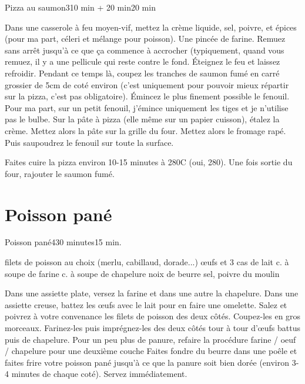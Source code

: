 {\begin{recette}{Pizza au saumon}{3}{10 min + 20 min}{20 min}
\begin{preparation}
\etape Dans une casserole à feu moyen-vif, mettez la crème liquide, sel, poivre, et épices (pour ma part, céleri et mélange 
pour poisson). Une pincée de farine. Remuez sans arrêt jusqu'à ce que ça commence à accrocher (typiquement, quand vous remuez, 
il y a une pellicule qui reste contre le fond. Éteignez le feu et laissez refroidir.
\etape Pendant ce temps là, coupez les tranches de saumon fumé en carré grossier de 5cm de coté environ (c'est uniquement pour pouvoir mieux répartir sur la pizza, c'est pas obligatoire).
\etape Émincez le plus finement possible le fenouil. Pour ma part, sur un petit fenouil, j'émince uniquement les tiges et je 
n'utilise pas le bulbe. 
\etape Sur la pâte à pizza (elle même sur un papier cuisson), étalez la crème. Mettez alors la pâte sur la grille du four.
\etape Mettez alors le fromage rapé. Puis saupoudrez le fenouil sur toute la surface.
\end{preparation}

\begin{cuisson}
Faites cuire la pizza environ 10-15 minutes à 280\degres C (oui, 280). Une fois sortie du four, rajouter le saumon fumé. 
\end{cuisson}
\end{recette}

\section{Poisson pané}
\begin{recette}{Poisson pané}{4}{30 minutes}{15 min.}
\begin{ingredients}
 filets de poisson au choix (merlu, cabillaud, dorade...)
 œufs et 3 cas de lait
 c. à soupe de farine
 c. à soupe de chapelure
 noix de beurre
\ingredient sel, poivre du moulin
\end{ingredients}

\begin{preparation}
\etape Dans une assiette plate, versez la farine et dans une autre la chapelure. Dans une assiette creuse, battez les œufs avec le lait pour en faire une omelette.
\etape Salez et poivrez à votre convenance les filets de poisson des deux côtés. Coupez-les en gros morceaux. Farinez-les puis imprégnez-les des deux côtés tour à tour d'œufs battus puis de chapelure.
\etape [optionnel] Pour un peu plus de panure, refaire la procédure farine / oeuf / chapelure pour une deuxième couche
\etape Faites fondre du beurre dans une poêle et faites frire votre poisson pané jusqu'à ce que la panure soit bien dorée (environ 3-4 minutes de chaque coté). Servez immédiatement.
\end{preparation}
\end{recette}


}
